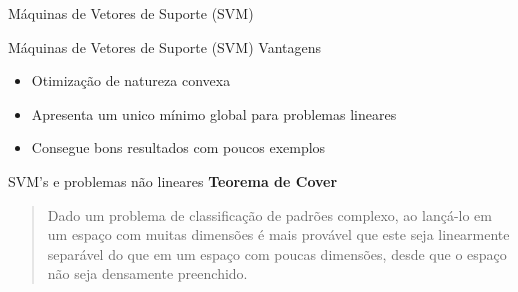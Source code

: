 \documentclass[10pt]{beamer}
\begin{document}
\begin{frame}{Máquinas de Vetores de Suporte (SVM)}
\end{frame}

\begin{frame}{Máquinas de Vetores de Suporte (SVM)}
  Vantagens 
  \begin{itemize}
    \item Otimização de natureza convexa
    \item Apresenta um unico mínimo global para problemas lineares
    \item Consegue bons resultados com poucos exemplos
  \end{itemize}

\end{frame}

\begin{frame}{SVM's e problemas não lineares}
    \textbf{Teorema de Cover}
    \begin{quote}
      Dado um problema de classificação de padrões complexo, ao lançá-lo em 
      um espaço com muitas dimensões é mais provável que este seja linearmente 
      separável do que em um espaço com poucas dimensões, desde que o espaço não seja densamente preenchido.
      \cite{haykin_neural_2010}
    \end{quote}
\end{frame}
\end{document}
